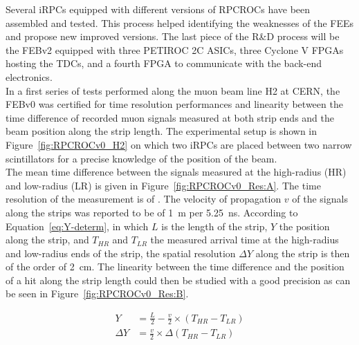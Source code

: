 	Several iRPCs equipped with different versions of RPCROCs have been assembled and tested. This process helped identifying the weaknesses of the FEEs and propose new improved versions. The last piece of the R\&D process will be the FEBv2 equipped with three PETIROC 2C ASICs, three Cyclone V FPGAs hosting the TDCs, and a fourth FPGA to communicate with the back-end electronics.\\
	In a first series of tests performed along the muon beam line H2 at CERN, the FEBv0 was certified for time resolution performances and linearity between the time difference of recorded muon signals measured at both strip ends and the beam position along the strip length. The experimental setup is shown in Figure~\ref{fig:RPCROCv0_H2} on which two iRPCs are placed between two narrow scintillators for a precise knowledge of the position of the beam.\\
	The mean time difference between the signals measured at the high-radius (HR) and low-radius (LR) is given in Figure~\ref{fig:RPCROCv0_Res:A}. The time resolution of the measurement is of . The velocity of propagation $v$ of the signals along the strips was reported to be of \SI{1}{m} per \SI{5.25}{ns}. According to Equation~\ref{eq:Y-determ}, in which $L$ is the length of the strip, $Y$ the position along the strip, and $T_{HR}$ and $T_{LR}$ the measured arrival time at the high-radius and low-radius ends of the strip, the spatial resolution $\Delta Y$ along the strip is then of the order of \SI{2}{cm}. The linearity between the time difference and the position of a hit along the strip length could then be studied with a good precision as can be seen in Figure~\ref{fig:RPCROCv0_Res:B}.
	
\endgroup
	
    \begin{equation}
		\label{eq:Y-determ}
		\begin{aligned}
			Y &= \frac{L}{2} - \frac{v}{2} \times (T_{HR}-T_{LR})\\
			\Delta Y &= \frac{v}{2} \times \Delta(T_{HR}-T_{LR})
		\end{aligned}
    \end{equation}
    
\newpage
	 
